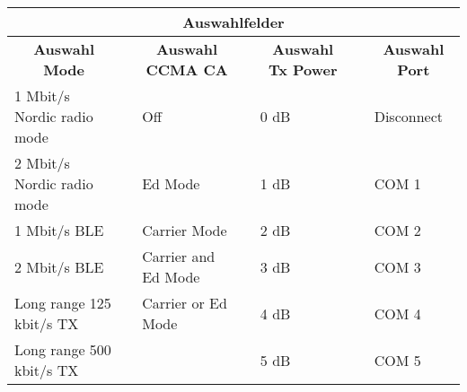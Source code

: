 \begin{table}[H]
	\centering
	\begin{adjustbox}{width=1\textwidth}
		\begin{tabular}{@{}llll|l|l|l|@{}}
			\toprule
			\multicolumn{7}{|c|}{\textbf{Auswahlfelder}}                                                                                                                                                                                    \\ \midrule
			\multicolumn{1}{|c|}{\textbf{Auswahl Mode}}         & \multicolumn{1}{l|}{} & \multicolumn{1}{c|}{\textbf{Auswahl CCMA CA}} &  & \multicolumn{1}{c|}{\textbf{Auswahl Tx Power}} &  & \multicolumn{1}{c|}{\textbf{Auswahl Port}} \\ \cmidrule(r){1-1} \cmidrule(lr){3-3} \cmidrule(lr){5-5} \cmidrule(l){7-7} 
			\multicolumn{1}{|l|}{1 Mbit/s Nordic radio mode}    & \multicolumn{1}{l|}{} & \multicolumn{1}{l|}{Off}                      &  & 0 dB                                           &  & Disconnect                                 \\ \cmidrule(r){1-1} \cmidrule(lr){3-3} \cmidrule(lr){5-5} \cmidrule(l){7-7} 
			\multicolumn{1}{|l|}{2 Mbit/s Nordic radio mode}    & \multicolumn{1}{l|}{} & \multicolumn{1}{l|}{Ed Mode}                  &  & 1 dB                                           &  & COM 1                                      \\ \cmidrule(r){1-1} \cmidrule(lr){3-3} \cmidrule(lr){5-5} \cmidrule(l){7-7} 
			\multicolumn{1}{|l|}{1 Mbit/s BLE}                  & \multicolumn{1}{l|}{} & \multicolumn{1}{l|}{Carrier Mode}             &  & 2 dB                                           &  & COM 2                                      \\ \cmidrule(r){1-1} \cmidrule(lr){3-3} \cmidrule(lr){5-5} \cmidrule(l){7-7} 
			\multicolumn{1}{|l|}{2 Mbit/s BLE}                  & \multicolumn{1}{l|}{} & \multicolumn{1}{l|}{Carrier and Ed Mode}      &  & 3 dB                                           &  & COM 3                                      \\ \cmidrule(r){1-1} \cmidrule(lr){3-3} \cmidrule(lr){5-5} \cmidrule(l){7-7} 
			\multicolumn{1}{|l|}{Long range 125 kbit/s TX}      & \multicolumn{1}{l|}{} & \multicolumn{1}{l|}{Carrier or Ed Mode}       &  & 4 dB                                           &  & COM 4                                      \\ \cmidrule(r){1-1} \cmidrule(lr){3-3} \cmidrule(lr){5-5} \cmidrule(l){7-7} 
			\multicolumn{1}{|l|}{Long range 500 kbit/s TX}      &                       &                                               &  & 5 dB                                           &  & COM 5                                      \\ \cmidrule(r){1-1} \cmidrule(lr){5-5} \cmidrule(l){7-7} 

\end{tabular}
\end{adjustbox}
\end{table}
